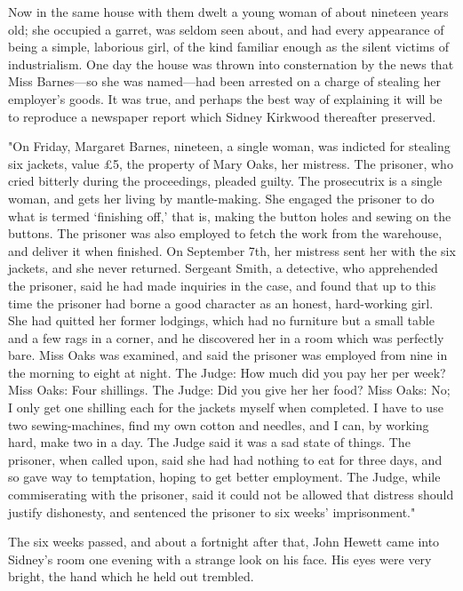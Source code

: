 Now in the same house with them dwelt a young woman of about nineteen
years old; she occupied a garret, was seldom seen about, and had every
appearance of being a simple, laborious girl, of the kind familiar
enough as the silent victims of industrialism. One day the house was
thrown into consternation by the news that Miss Barnes---so she was
named---had been arrested on a charge of stealing her employer's goods.
It was true, and perhaps the best way of explaining it will be to
reproduce a newspaper report which Sidney Kirkwood thereafter preserved.

"On Friday, Margaret Barnes, nineteen, a single woman, was indicted for
stealing six jackets, value £5, the property of Mary Oaks, her mistress.
The prisoner, who cried bitterly during the proceedings, pleaded guilty.
The prosecutrix is a single woman, and gets her living by mantle-making.
She engaged the prisoner to do what is termed `finishing off,' that is,
making the button holes and sewing {\protect\hypertarget{130}{}{}}on the
buttons. The prisoner was also employed to fetch the work from the
warehouse, and deliver it when finished. On September 7th, her mistress
sent her with the six jackets, and she never returned. Sergeant Smith, a
detective, who apprehended the prisoner, said he had made inquiries in
the case, and found that up to this time the prisoner had borne a good
character as an honest, hard-working girl. She had quitted her former
lodgings, which had no furniture but a small table and a few rags in a
corner, and he discovered her in a room which was perfectly bare. Miss
Oaks was examined, and said the prisoner was employed from nine in the
morning to eight at night. The Judge: How much did you pay her per week?
Miss Oaks: Four shillings. The Judge: Did you give her her food? Miss
Oaks: No; I only get one shilling each for the jackets myself when
completed. I have to use two sewing-machines, find my own cotton and
needles, and I can, by working hard, make two in a day. The Judge said
it was a sad state of things. The
{\protect\hypertarget{131}{}{}}prisoner, when called upon, said she had
had nothing to eat for three days, and so gave way to temptation, hoping
to get better employment. The Judge, while commiserating with the
prisoner, said it could not be allowed that distress should justify
dishonesty, and sentenced the prisoner to six weeks' imprisonment."

The six weeks passed, and about a fortnight after that, John Hewett came
into Sidney's room one evening with a strange look on his face. His eyes
were very bright, the hand which he held out trembled.

